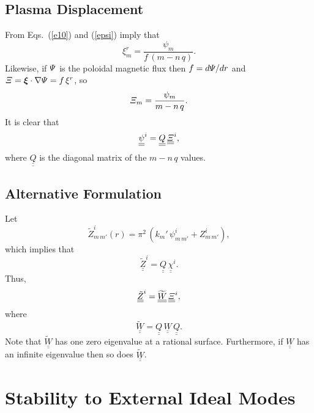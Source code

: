 \documentclass[12pt,prb,aps,notitlepage]{revtex4-1}
\newcommand{\bxi}{\mbox{\boldmath$\xi$}}
\begin{document}
\subsection{Plasma Displacement}
From Eqs.~(\ref{e10}) and (\ref{epsi}) imply that
\begin{equation}
\xi^r_m = \frac{\psi_m}{f\,(m-n\,q)}.
\end{equation}
Likewise, if ${\mit\Psi}$ is the poloidal magnetic flux then $f=d{\mit\Psi}/dr$ and ${\mit\Xi}=\bxi\cdot\nabla{\mit\Psi}= f\,\xi^r$, so
\begin{equation}
{\mit\Xi}_m = \frac{\psi_m}{m-n\,q}.
\end{equation}
It is clear that
\begin{equation}
\underline{\underline{\psi}}^i = \underline{\underline{Q}}\,\underline{\underline{\mit\Xi}}^i,
\end{equation}
where $\underline{\underline{Q}}$ is the diagonal matrix of the $m-n\,q$ values. 

\subsection{Alternative Formulation}
Let
\begin{equation}
\tilde{Z}^i_{m\,m'}(r) = \pi^2\,(k_{m}'\,\psi^i_{m\,m'}+Z_{m\,m'}^i),
\end{equation}
which implies that
\begin{equation}
\underline{\underline{\tilde{Z}}}^i = \underline{\underline{Q}}\,\underline{\underline{\chi}}^i.
\end{equation}
Thus,
\begin{equation}
\underline{\underline{\tilde{Z}}}^i= \underline{\underline{\widetilde{W}}}\,\underline{\underline{\mit\Xi}}^i,
\end{equation}
where
\begin{equation}
\underline{\underline{\widetilde{W}}}= \underline{\underline{Q}}\,\underline{\underline{W}}\,\underline{\underline{Q}}.
\end{equation}
Note that $\underline{\underline{\widetilde{W}}}$ has one zero eigenvalue at a rational surface. Furthermore, if
$\underline{\underline{W}}$ has an infinite eigenvalue then so does $\underline{\underline{\widetilde{W}}}$.

\section{Stability to External Ideal Modes}
\end{document}
